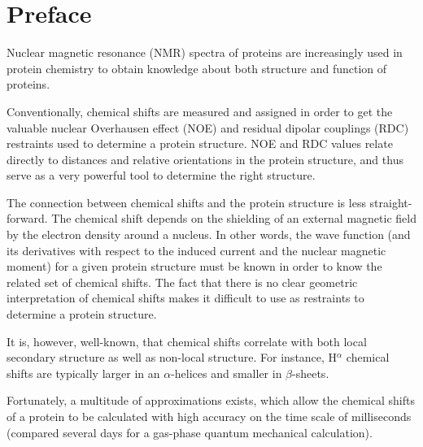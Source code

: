 \chapter*{Preface}

Nuclear magnetic resonance (NMR) spectra of proteins are increasingly used in protein chemistry to obtain knowledge about both structure and function of proteins.

Conventionally, chemical shifts are measured and assigned in order to get the valuable nuclear Overhausen effect (NOE) and residual dipolar couplings (RDC) restraints used to determine a protein structure. NOE and RDC values relate directly to distances and relative orientations in the protein structure, and thus serve as a very powerful tool to determine the right structure.

The connection between chemical shifts and the protein structure is less straight-forward.
The chemical shift depends on the shielding of an external magnetic field by the electron density around a nucleus.
In other words, the wave function (and its derivatives with respect to the induced current and the nuclear magnetic moment) for a given protein structure must be known in order to know the related set of chemical shifts.
The fact that there is no clear geometric interpretation of chemical shifts makes it difficult to use as restraints to determine a protein structure.

It is, however, well-known, that chemical shifts correlate with both local secondary structure as well as non-local structure. For instance, H$^\alpha$ chemical shifts are typically larger in an $\alpha$-helices and smaller in $\beta$-sheets.

Fortunately, a multitude of approximations exists, which allow the chemical shifts of a protein to be calculated with high accuracy on the time scale of milliseconds (compared several days for a gas-phase quantum mechanical calculation).



